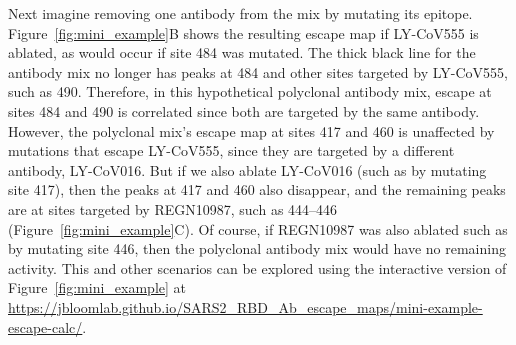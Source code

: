 \documentclass[9pt,twocolumn,twoside]{gsajnl_modified}
\begin{document}
Next imagine removing one antibody from the mix by mutating its epitope.
Figure~\ref{fig:mini_example}B shows the resulting escape map if LY-CoV555 is ablated, as would occur if site 484 was mutated.
The thick black line for the antibody mix no longer has peaks at 484 and other sites targeted by LY-CoV555, such as 490.
Therefore, in this hypothetical polyclonal antibody mix, escape at sites 484 and 490 is correlated since both are targeted by the same antibody.
However, the polyclonal mix's escape map at sites 417 and 460 is unaffected by mutations that escape LY-CoV555, since they are targeted by a different antibody, LY-CoV016.
But if we also ablate LY-CoV016 (such as by mutating site 417), then the peaks at 417 and 460 also disappear, and the remaining peaks are at sites targeted by REGN10987, such as 444--446 (Figure~\ref{fig:mini_example}C).
Of course, if REGN10987 was also ablated such as by mutating site 446, then the polyclonal antibody mix would have no remaining activity.
This and other scenarios can be explored using the interactive version of Figure~\ref{fig:mini_example} at \url{https://jbloomlab.github.io/SARS2_RBD_Ab_escape_maps/mini-example-escape-calc/}.
\end{document}
